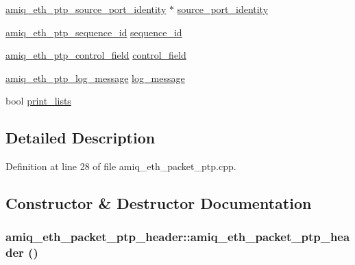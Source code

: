 \begin{DoxyCompactItemize}
\item 
\hyperlink{amiq__eth__types_8cpp_a7b096840c16198d2ce0842b243717a35}{amiq\_\-eth\_\-ptp\_\-source\_\-port\_\-identity} $\ast$ \hyperlink{classamiq__eth__packet__ptp__header_aa66d99d4acc74866ed54741a0dff543e}{source\_\-port\_\-identity}
\item 
\hyperlink{amiq__eth__types_8cpp_aaea31f7f426979f21cdaf229cfdd46ad}{amiq\_\-eth\_\-ptp\_\-sequence\_\-id} \hyperlink{classamiq__eth__packet__ptp__header_a7a93c17fb2f7e9d104b8456678cb6085}{sequence\_\-id}
\item 
\hyperlink{amiq__eth__types_8cpp_ab23b2951ab7f4c22548f39f4c9a9e33c}{amiq\_\-eth\_\-ptp\_\-control\_\-field} \hyperlink{classamiq__eth__packet__ptp__header_a0ac39ffa7e8fccfebafd2ed81188e3ee}{control\_\-field}
\item 
\hyperlink{amiq__eth__types_8cpp_a336894c24b80e460e8ddf8f16027504d}{amiq\_\-eth\_\-ptp\_\-log\_\-message} \hyperlink{classamiq__eth__packet__ptp__header_a0318633469361ac605e5271d83c6b75e}{log\_\-message}
\item 
bool \hyperlink{classamiq__eth__packet__ptp__header_a0461d63c0667a1d6a1fb32185fa4fcf0}{print\_\-lists}
\end{DoxyCompactItemize}


\subsection{Detailed Description}


Definition at line 28 of file amiq\_\-eth\_\-packet\_\-ptp.cpp.

\subsection{Constructor \& Destructor Documentation}
\hypertarget{classamiq__eth__packet__ptp__header_a4c7b83f795d49fb4ea8c4d84a9d8a5e1}{
\subsubsection[{amiq\_\-eth\_\-packet\_\-ptp\_\-header}]{\setlength{\rightskip}{0pt plus 5cm}amiq\_\-eth\_\-packet\_\-ptp\_\-header::amiq\_\-eth\_\-packet\_\-ptp\_\-header ()}}
\label{classamiq__eth__packet__ptp__header_a4c7b83f795d49fb4ea8c4d84a9d8a5e1}


